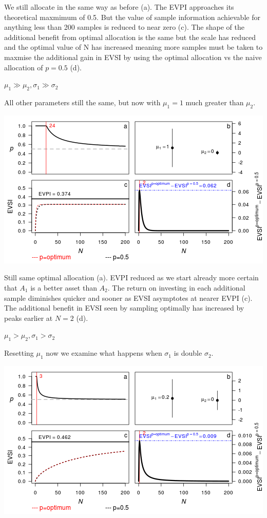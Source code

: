 We still allocate in the same way as before (a). The EVPI approaches its
theoretical maxmimum of 0.5. But the value of sample information
achievable for anything less than 200 samples is reduced to near zero
(c). The shape of the additional benefit from optimal allocation is the
same but the scale has reduced and the optimal value of N has increased
meaning more samples must be taken to maxmise the additional gain in
EVSI by using the optimal allocation vs the naive allocation of
\(p=0.5\) (d).

\textbf{\(\mu_1 \gg \mu_2, \sigma_1 \gg \sigma_2\)}

All other parameters still the same, but now with \(\mu_1=1\) much
greater than \(\mu_2\).

\includegraphics{figure/unnamed-chunk-4-1.png} \clearpage

Still same optimal allocation (a). EVPI reduced as we start already more
certain that \(A_1\) is a better asset than \(A_2\). The return on
investing in each additional sample diminishes quicker and sooner as
EVSI asymptotes at nearer EVPI (c). The additional benefit in EVSI seen
by sampling optimally has increased by peaks earlier at \(N=2\) (d).

\textbf{\(\mu_1 > \mu_2, \sigma_1 > \sigma_2\)}

Resetting \(\mu_1\) now we examine what happens when \(\sigma_1\) is
double \(\sigma_2\).

\includegraphics{figure/unnamed-chunk-5-1.png} \clearpage

